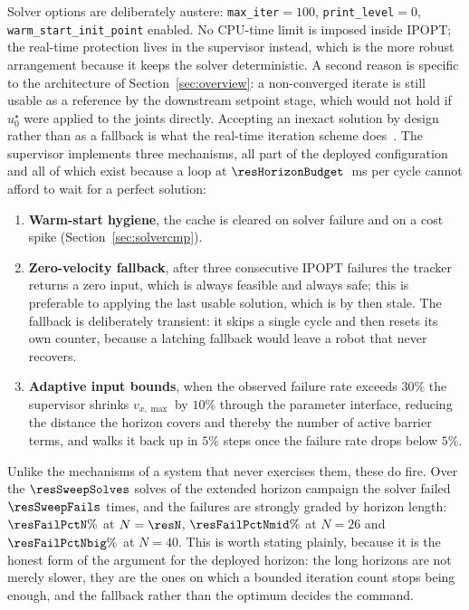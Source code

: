 \documentclass[11pt,a4paper]{article}
\begin{document}
Solver options are deliberately austere: \texttt{max\_iter}$=100$, \texttt{print\_level}$=0$,
\texttt{warm\_start\_init\_point} enabled. No CPU-time limit is imposed inside IPOPT; the real-time
protection lives in the supervisor instead, which is the more robust arrangement because it keeps the solver
deterministic. A second reason is specific to the architecture of Section~\ref{sec:overview}: a non-converged
iterate is still usable as a reference by the downstream setpoint stage, which would not hold if $u^\star_0$
were applied to the joints directly. Accepting an inexact solution by design rather than as a fallback is
what the real-time iteration scheme does~\cite{diehl2005realtime}. The supervisor implements three mechanisms, all part of the deployed
configuration and all of which exist because a loop at $\resHorizonBudget$~ms per cycle cannot afford to wait
for a perfect solution:
\begin{enumerate}[label=\arabic*.]
  \item \textbf{Warm-start hygiene}, the cache is cleared on solver failure and on a cost spike
        (Section~\ref{sec:solvercmp}).
  \item \textbf{Zero-velocity fallback}, after three consecutive IPOPT failures the tracker returns a zero
        input, which is always feasible and always safe; this is preferable to applying the last usable
        solution, which is by then stale. The fallback is deliberately transient: it skips a single cycle and
        then resets its own counter, because a latching fallback would leave a robot that never recovers.
  \item \textbf{Adaptive input bounds}, when the observed failure rate exceeds $30\%$ the supervisor
        shrinks $v_{x,\max}$ by $10\%$ through the parameter interface, reducing the distance the horizon
        covers and thereby the number of active barrier terms, and walks it back up in $5\%$ steps once the
        failure rate drops below $5\%$.
\end{enumerate}
Unlike the mechanisms of a system that never exercises them, these do fire. Over the $\resSweepSolves$ solves
of the extended horizon campaign the solver failed $\resSweepFails$ times, and the failures are strongly
graded by horizon length: $\resFailPctN\%$ at $N=\resN$, $\resFailPctNmid\%$ at $N=26$ and
$\resFailPctNbig\%$ at $N=40$. This is worth stating plainly, because it is the honest form of the argument
for the deployed horizon: the long horizons are not merely slower, they are the ones on which a bounded
iteration count stops being enough, and the fallback rather than the optimum decides the command.
\end{document}
